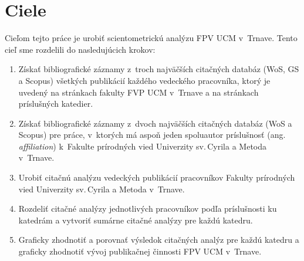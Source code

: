 \chapter{Ciele}
\label{chap:objectives}

Cieľom tejto práce je urobiť scientometrickú analýzu FPV UCM v~Trnave.  Tento
cieľ sme rozdelili do nasledujúcich krokov:

\begin{enumerate}
\item Získať bibliografické záznamy z~troch najväčších citačných databáz (WoS,
  GS a Scopus) všetkých publikácií každého vedeckého pracovníka, ktorý je
  uvedený na stránkach fakulty FVP UCM v~Trnave a na stránkach príslušných
  katedier.
\item Získať bibliografické záznamy z~dvoch najväčších citačných databáz (WoS a
  Scopus) pre práce, v~ktorých má aspoň jeden spoluautor príslušnosť
  (ang.\,\emph{affiliation}) k~Fakulte prírodných vied Univerzity sv.\,Cyrila a
  Metoda v~Trnave.
\item Urobiť citačnú analýzu vedeckých publikácií pracovníkov Fakulty prírodných
  vied Univerzity sv.\,Cyrila a Metoda v~Trnave.
\item Rozdeliť citačné analýzy jednotlivých pracovníkov podľa príslušnosti ku
  katedrám a vytvoriť sumárne citačné analýzy pre každú katedru.
\item Graficky zhodnotiť a porovnať výsledok citačných analýz pre každú katedru
  a graficky zhodnotiť vývoj publikačnej činnosti FPV UCM v~Trnave.
\end{enumerate}



